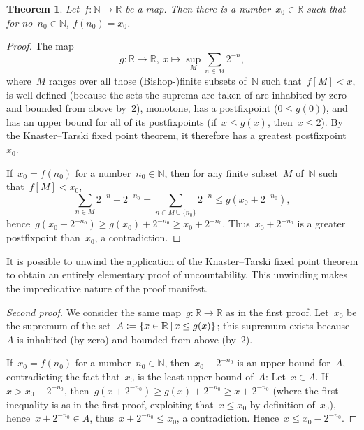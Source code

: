\documentclass[oneside]{amsart}
\newcommand{\NN}{\mathbb{N}}
\newcommand{\RR}{\mathbb{R}}
\theoremstyle{definition}
\theoremstyle{plain}
\newtheorem*{thm*}{Theorem}
\theoremstyle{remark}
\newcommand{\defeq}{\vcentcolon=}
\begin{document}
\begin{thm*}Let~$f : \NN \to \RR$ be a map. Then there is a number~$x_0 \in \RR$
such that for no~$n_0 \in \NN$, $f(n_0) = x_0$.\end{thm*}

\begin{proof}The map
\[ g : \RR \longrightarrow \RR,\
  x \longmapsto \sup_M \sum_{n \in M} 2^{-n}, \]
where~$M$ ranges over all those (Bishop-)finite subsets of~$\NN$ such
that~$f[M] < x$, is well-defined (because the sets the suprema are taken of are
inhabited by zero and bounded from above by~$2$), monotone, has a postfixpoint
($0 \leq g(0)$), and has an upper bound for all of its postfixpoints (if~$x
\leq g(x)$, then~$x \leq 2$). By the Knaster--Tarski fixed point theorem, it
therefore has a greatest postfixpoint~$x_0$.

If~$x_0 = f(n_0)$ for a number~$n_0 \in \NN$, then for any finite
subset~$M$ of~$\NN$ such that~$f[M] < x_0$,
\[ \sum_{n \in M} 2^{-n} + 2^{-n_0} = \sum_{n \in M \cup \{n_0\}} 2^{-n}
  \leq g(x_0 + 2^{-n_0}), \]
hence~$g(x_0 + 2^{-n_0}) \geq g(x_0) + 2^{-n_0} \geq x_0 + 2^{-n_0}$.
Thus~$x_0 + 2^{-n_0}$ is a greater postfixpoint than~$x_0$, a contradiction.
\end{proof}

It is possible to unwind the application of the Knaster--Tarski fixed point
theorem to obtain an entirely elementary proof of uncountability. This
unwinding makes the impredicative nature of the proof manifest.

\begin{proof}[Second proof]We consider the same map~$g : \RR \to \RR$ as in the
first proof. Let~$x_0$ be the supremum of the set~$A \defeq \{ x \in \RR \,|\,
x \leq g(x) \}$; this supremum exists because~$A$ is inhabited (by zero)
and bounded from above (by~$2$).

If~$x_0 = f(n_0)$ for a number~$n_0 \in \NN$, then~$x_0 - 2^{-n_0}$ is an
upper bound for~$A$, contradicting the fact that~$x_0$ is the least upper bound
of~$A$: Let~$x \in A$. If~$x > x_0 - 2^{-n_0}$, then~$g(x +
2^{-n_0}) \geq g(x) + 2^{-n_0} \geq x + 2^{-n_0}$ (where the first inequality
is as in the first proof, exploiting that~$x \leq x_0$ by definition of~$x_0$), hence~$x + 2^{-n_0} \in A$,
thus~$x + 2^{-n_0} \leq x_0$, a contradiction. Hence~$x \leq x_0 - 2^{-n_0}$.
\end{proof}

\printbibliography
\end{document}
